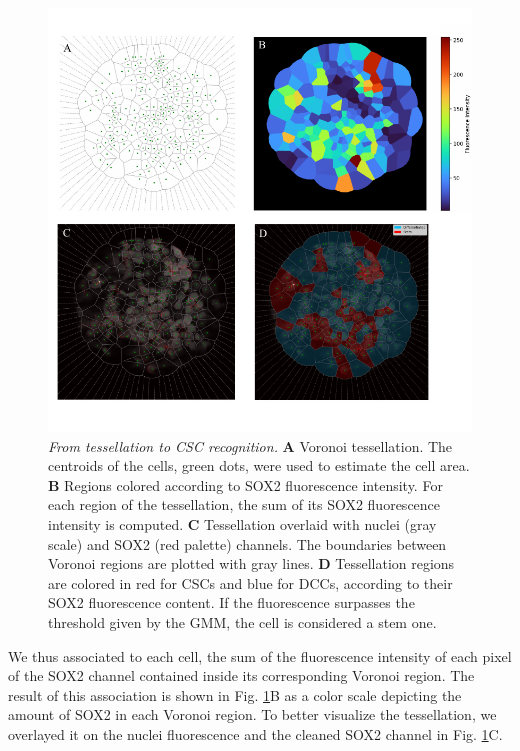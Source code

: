 \documentclass[fleqn,10pt]{wlscirep}
\begin{document}
\begin{figure}[!ht]
   \includegraphics[width=\textwidth]{images/tessellation_to_csc_recognition-eps-converted-to.pdf}
   \caption{\emph{From tessellation to CSC recognition.} \textbf{A} Voronoi tessellation. The centroids of the cells, green dots, were used to estimate the cell area. \textbf{B} Regions colored according to SOX2 fluorescence intensity. For each region of the tessellation, the sum of its SOX2 fluorescence intensity is computed. \textbf{C} Tessellation overlaid with nuclei (gray scale) and SOX2 (red palette) channels. The boundaries between Voronoi regions are plotted with gray lines. \textbf{D} Tessellation regions are colored in red for CSCs and blue for DCCs, according to their SOX2 fluorescence content. If the fluorescence surpasses the threshold given by the GMM, the cell is considered a stem one.}
   \label{fig: tessellation to clustered}
\end{figure}

We thus associated to each cell, the sum of the fluorescence intensity of each pixel of the SOX2 channel contained inside its corresponding Voronoi region. The result of this association is shown in Fig. \ref{fig: tessellation to clustered}B as a color scale depicting the amount of SOX2 in each Voronoi region. To better visualize the tessellation, we overlayed it on the nuclei fluorescence and the cleaned SOX2 channel in Fig. \ref{fig: tessellation to clustered}C.
\end{document}
